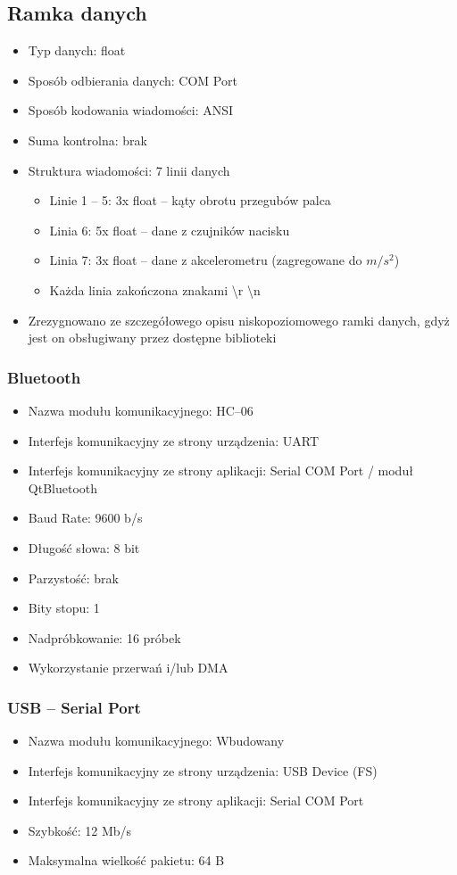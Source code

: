 \documentclass[12pt,a4paper]{article}
\begin{document}
\subsection{Ramka danych}
\begin{itemize}
\item Typ danych: float
\item Sposób odbierania danych: COM Port
\item Sposób kodowania wiadomości: ANSI
\item Suma kontrolna: brak
\item Struktura wiadomości: 7 linii danych
\begin{itemize}
\item Linie 1 -- 5: 3x float -- kąty obrotu przegubów palca
\item Linia 6: 5x float -- dane z czujników nacisku
\item Linia 7: 3x float -- dane z akcelerometru (zagregowane do $m/s^2$)
\item Każda linia zakończona znakami \textbackslash r \textbackslash n
\end{itemize}
\item Zrezygnowano ze szczegółowego opisu niskopoziomowego ramki danych, gdyż jest on obsługiwany przez dostępne biblioteki
\end{itemize}
\subsubsection{Bluetooth}
\begin{itemize}
\item Nazwa modułu komunikacyjnego: HC--06
\item Interfejs komunikacyjny ze strony urządzenia: UART
\item Interfejs komunikacyjny ze strony aplikacji: Serial COM Port / moduł QtBluetooth
\item Baud Rate: 9600 b/s
\item Długość słowa: 8 bit
\item Parzystość: brak
\item Bity stopu: 1
\item Nadpróbkowanie: 16 próbek
\item Wykorzystanie przerwań i/lub DMA
\end{itemize}
\subsubsection{USB -- Serial Port}
\begin{itemize}
\item Nazwa modułu komunikacyjnego: Wbudowany
\item Interfejs komunikacyjny ze strony urządzenia: USB Device (FS)
\item Interfejs komunikacyjny ze strony aplikacji: Serial COM Port
\item Szybkość: 12 Mb/s
\item Maksymalna wielkość pakietu: 64 B
\end{itemize}
\end{document}
